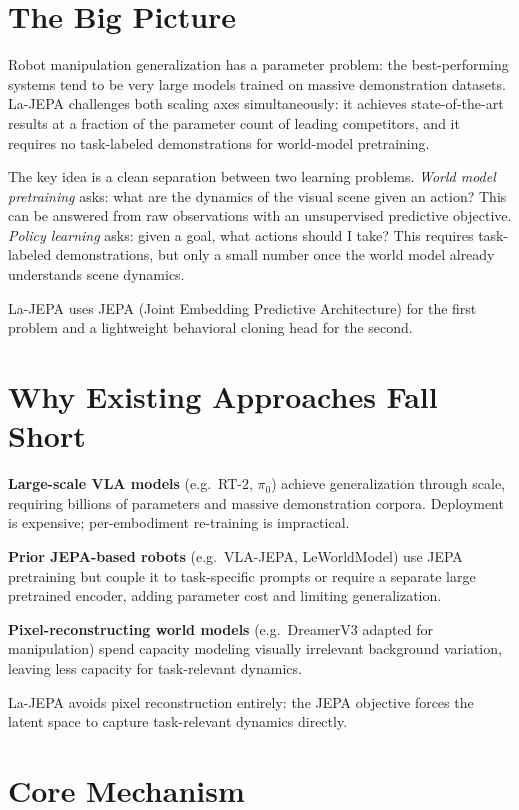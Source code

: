 \documentclass[10pt,twocolumn]{article}
\begin{document}
\section{The Big Picture}

Robot manipulation generalization has a parameter problem: the best-performing systems tend to be very large models trained on massive demonstration datasets.
La-JEPA challenges both scaling axes simultaneously: it achieves state-of-the-art results at a fraction of the parameter count of leading competitors, and it requires no task-labeled demonstrations for world-model pretraining.

The key idea is a clean separation between two learning problems.
\textit{World model pretraining} asks: what are the dynamics of the visual scene given an action?
This can be answered from raw observations with an unsupervised predictive objective.
\textit{Policy learning} asks: given a goal, what actions should I take?
This requires task-labeled demonstrations, but only a small number once the world model already understands scene dynamics.

La-JEPA uses JEPA (Joint Embedding Predictive Architecture) for the first problem and a lightweight behavioral cloning head for the second.

\section{Why Existing Approaches Fall Short}

\textbf{Large-scale VLA models} (e.g.\ RT-2, $\pi_0$) achieve generalization through scale, requiring billions of parameters and massive demonstration corpora.
Deployment is expensive; per-embodiment re-training is impractical.

\textbf{Prior JEPA-based robots} (e.g.\ VLA-JEPA, LeWorldModel) use JEPA pretraining but couple it to task-specific prompts or require a separate large pretrained encoder, adding parameter cost and limiting generalization.

\textbf{Pixel-reconstructing world models} (e.g.\ DreamerV3 adapted for manipulation) spend capacity modeling visually irrelevant background variation, leaving less capacity for task-relevant dynamics.

La-JEPA avoids pixel reconstruction entirely: the JEPA objective forces the latent space to capture task-relevant dynamics directly.

\section{Core Mechanism}
\end{document}
